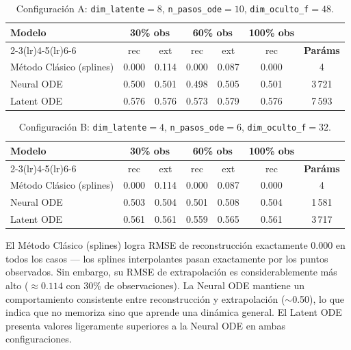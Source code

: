 \documentclass[12pt,a4paper]{article}
\begin{document}
\begin{table}[H]
  \centering
  \caption{Configuración A: \texttt{dim\_latente}$=8$, \texttt{n\_pasos\_ode}$=10$,
           \texttt{dim\_oculto\_f}$=48$.}
  \label{tab:config_a}
  \begin{tabular}{lcccccc}
    \toprule
    \multirow{2}{*}{\textbf{Modelo}}
      & \multicolumn{2}{c}{\textbf{30\% obs}}
      & \multicolumn{2}{c}{\textbf{60\% obs}}
      & \textbf{100\% obs}
      & \\
    \cmidrule(lr){2-3}\cmidrule(lr){4-5}\cmidrule(lr){6-6}
      & rec & ext & rec & ext & rec & \textbf{Paráms} \\
    \midrule
    Método Clásico (splines) & 0.000 & 0.114 & 0.000 & 0.087 & 0.000 & 4 \\
    Neural ODE               & 0.500 & 0.501 & 0.498 & 0.505 & 0.501 & 3\,721 \\
    Latent ODE               & 0.576 & 0.576 & 0.573 & 0.579 & 0.576 & 7\,593 \\
    \bottomrule
  \end{tabular}
\end{table}

\begin{table}[H]
  \centering
  \caption{Configuración B: \texttt{dim\_latente}$=4$, \texttt{n\_pasos\_ode}$=6$,
           \texttt{dim\_oculto\_f}$=32$.}
  \label{tab:config_b}
  \begin{tabular}{lcccccc}
    \toprule
    \multirow{2}{*}{\textbf{Modelo}}
      & \multicolumn{2}{c}{\textbf{30\% obs}}
      & \multicolumn{2}{c}{\textbf{60\% obs}}
      & \textbf{100\% obs}
      & \\
    \cmidrule(lr){2-3}\cmidrule(lr){4-5}\cmidrule(lr){6-6}
      & rec & ext & rec & ext & rec & \textbf{Paráms} \\
    \midrule
    Método Clásico (splines) & 0.000 & 0.114 & 0.000 & 0.087 & 0.000 & 4 \\
    Neural ODE               & 0.503 & 0.504 & 0.501 & 0.508 & 0.504 & 1\,581 \\
    Latent ODE               & 0.561 & 0.561 & 0.559 & 0.565 & 0.561 & 3\,717 \\
    \bottomrule
  \end{tabular}
\end{table}

El Método Clásico (splines) logra RMSE de reconstrucción exactamente 0.000 en todos
los casos --- los splines interpolantes pasan exactamente por los puntos observados.
Sin embargo, su RMSE de extrapolación es considerablemente más alto
($\approx 0.114$ con 30\% de observaciones).
La Neural ODE mantiene un comportamiento consistente entre reconstrucción y
extrapolación ($\sim$0.50), lo que indica que no memoriza sino que aprende una
dinámica general.
El Latent ODE presenta valores ligeramente superiores a la Neural ODE en ambas
configuraciones.
\end{document}
